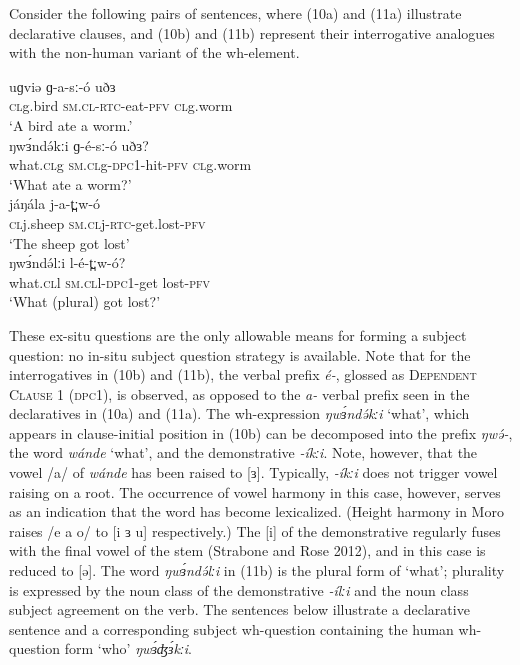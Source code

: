 Consider the following pairs of sentences, where (10a) and (11a) illustrate declarative clauses, and (10b) and (11b) represent their interrogative analogues with the non-human variant of the wh-element.

\ea
\ea \gll	uɡviə	ɡ-a-sː-ó	uðɜ\\
		\textsc{cl}g.bird	\textsc{sm.cl}-\textsc{rtc}-eat-\textsc{pfv}	\textsc{cl}g.worm\\
\trans		‘A bird ate a worm.’\\
\ex \gll	ŋwɜ́ndə́kːi	ɡ-é-sː-ó	uðɜ?		\\
		what.\textsc{cl}g	\textsc{sm.cl}g-\textsc{dpc}1-hit-\textsc{pfv}	\textsc{cl}g.worm\\
\trans		‘What ate a worm?’\\
\z
\z
\ea
\ea \gll	jáŋála	j-a-t̪ːw-ó	\\	
		\textsc{cl}j.sheep	\textsc{sm.cl}j-\textsc{rtc}-get.lost-\textsc{pfv}	\\
\trans		‘The sheep got lost’\\
\ex \gll	ŋwɜ́ndə́lːi	l-é-t̪ːw-ó?\\		
		what.\textsc{cl}l	\textsc{sm.cl}l-\textsc{dpc}1-get lost-\textsc{pfv}	\\
\trans		‘What (plural) got lost?’	\\
\z
\z

These ex-situ questions are the only allowable means for forming a subject question: no in-situ subject question strategy is available. Note that for the interrogatives in (10b) and (11b), the verbal prefix \textit{é-}, glossed as \textsc{Dependent Clause} 1 (\textsc{dpc}1), is observed, as opposed to the \textit{a-} verbal prefix seen in the declaratives in (10a) and (11a). The wh-expression \textit{ŋwɜ́ndə́kːi} ‘what’, which appears in clause-initial position in (10b) can be decomposed into the prefix \textit{ŋwə́-}, the word \textit{wánde} ‘what’, and the demonstrative \textit{-íkːi}. Note, however, that the vowel /a/ of \textit{wánde} has been raised to [ɜ]. Typically, \textit{-íkːi} does not trigger vowel raising on a root. The occurrence of vowel harmony in this case, however, serves as an indication that the word has become lexicalized. (Height harmony in Moro raises /e a o/ to [i ɜ u] respectively.) The [i] of the demonstrative regularly fuses with the final vowel of the stem (Strabone and Rose 2012), and in this case is reduced to [ə]. The word \textit{ŋwɜ́ndə́lːi} in (11b) is the plural form of ‘what’; plurality is expressed by the noun class of the demonstrative \textit{-ílːi} and the noun class subject agreement on the verb.
The sentences below illustrate a declarative sentence and a corresponding subject wh-question containing the human wh-question form ‘who’ \textit{ŋwɜ́ʤɜ́kːi}. 

